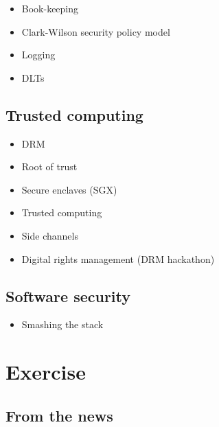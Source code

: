 \begin{frame}
  \begin{itemize}
    \item Book-keeping
    \item Clark-Wilson security policy model
    \item Logging
    \item DLTs
  \end{itemize}
\end{frame}

\subsection{Trusted computing}

\begin{frame}
  \begin{itemize}
    \item DRM
    \item Root of trust
    \item Secure enclaves (SGX)
    \item Trusted computing
    \item Side channels
    \item Digital rights management (DRM hackathon)
  \end{itemize}
\end{frame}

\subsection{Software security}

\begin{frame}
  \begin{itemize}
    \item Smashing the stack \etc
  \end{itemize}
\end{frame}


\section{Exercise}

\subsection{From the news}

